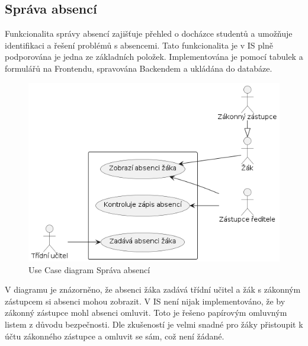 \documentclass[FM,Proj]{tulthesis}
\begin{document}
\subsection*{Správa absencí}
Funkcionalita správy absencí zajišťuje přehled o docházce studentů a umožňuje identifikaci
a řešení problémů s absencemi. Tato funkcionalita je v IS plně podporována je jedna ze 
základních položek. Implementována je pomocí tabulek a formulářů na Frontendu, spravována 
Backendem a ukládána do databáze.

\begin{figure}[H]
    \includegraphics[width=\textwidth-28pt]{uc-sprava-absenci.png}
    \caption{Use Case diagram Správa absencí}
    \label{fig:uc-sprava-absenci}
\end{figure}

V diagramu je znázorněno, že absenci žáka zadává třídní učitel a žák s zákonným zástupcem
si absenci mohou zobrazit. V IS není nijak implementováno, že by zákonný zástupce mohl
absenci omluvit. Toto je řešeno papírovým omluvným listem z důvodu bezpečnosti. Dle zkušeností
je velmi snadné pro žáky přistoupit k účtu zákonného zástupce a omluvit se sám, což není žádané.
\end{document}
